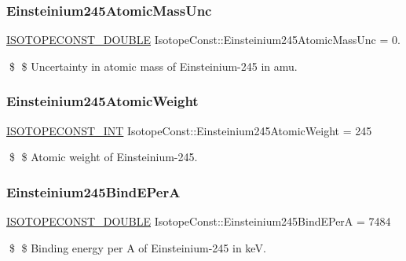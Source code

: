 \subsubsection{\texorpdfstring{Einsteinium245\+Atomic\+Mass\+Unc}{Einsteinium245AtomicMassUnc}}
{\footnotesize\ttfamily \mbox{\hyperlink{group___isotope_const-_macros_ga8f45a7272ce02c0b4c65c44636ed719a}{I\+S\+O\+T\+O\+P\+E\+C\+O\+N\+S\+T\+\_\+\+D\+O\+U\+B\+LE}} Isotope\+Const\+::\+Einsteinium245\+Atomic\+Mass\+Unc = 0.}

\$ \$ Uncertainty in atomic mass of Einsteinium-\/245 in amu. \mbox{\label{group___isotope_const-_einsteinium-_es245_ga2a012047022806a1d77b80a2be09586e}} 
\subsubsection{\texorpdfstring{Einsteinium245\+Atomic\+Weight}{Einsteinium245AtomicWeight}}
{\footnotesize\ttfamily \mbox{\hyperlink{group___isotope_const-_macros_ga5f18360b3e99483a35c32d789e62621c}{I\+S\+O\+T\+O\+P\+E\+C\+O\+N\+S\+T\+\_\+\+I\+NT}} Isotope\+Const\+::\+Einsteinium245\+Atomic\+Weight = 245}

\$ \$ Atomic weight of Einsteinium-\/245. \mbox{\label{group___isotope_const-_einsteinium-_es245_ga59b94d572c2e612d8d97de285422a7a6}} 
\subsubsection{\texorpdfstring{Einsteinium245\+Bind\+E\+PerA}{Einsteinium245BindEPerA}}
{\footnotesize\ttfamily \mbox{\hyperlink{group___isotope_const-_macros_ga8f45a7272ce02c0b4c65c44636ed719a}{I\+S\+O\+T\+O\+P\+E\+C\+O\+N\+S\+T\+\_\+\+D\+O\+U\+B\+LE}} Isotope\+Const\+::\+Einsteinium245\+Bind\+E\+PerA = 7484}

\$ \$ Binding energy per A of Einsteinium-\/245 in keV. \mbox{\label{group___isotope_const-_einsteinium-_es245_ga23b3673c8332c23a3a7d55ff58aafa43}} 
